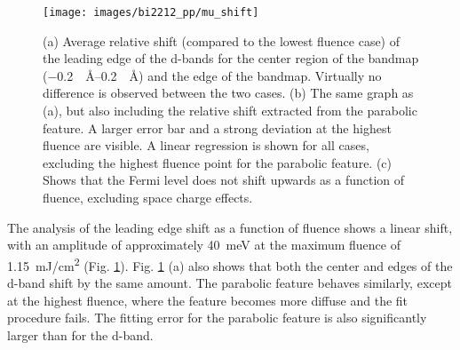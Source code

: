\begin{figure}[b!]
	\centering
	\texttt{[image: images/bi2212\_pp/mu\_shift]}
	\caption{(a) Average relative shift (compared to the lowest fluence case) of the leading edge of the  d-bands for the center region of the bandmap (\qtyrange{-0.2}{0.2}{\per\angstrom}) and the edge of the bandmap. Virtually no difference is observed between the two cases. (b) The same graph as (a), but also including the relative shift extracted from the parabolic feature. A larger error bar and a strong deviation at the highest fluence are visible. A linear regression is shown for all cases, excluding the highest fluence point for the parabolic feature. (c) Shows that the Fermi level does not shift upwards as a function of fluence, excluding space charge effects.}
	\label{fig:mu_shift}
\end{figure}

The analysis of the leading edge shift as a function of fluence shows a linear shift, with an amplitude of approximately \qty{40}{\milli\electronvolt} at the maximum fluence of \qty{1.15}{\milli\joule/\centi\meter\squared} (Fig. \ref{fig:mu_shift}).
Fig. \ref{fig:mu_shift} (a) also shows that both the center and edges of the  d-band shift by the same amount.
The parabolic feature behaves similarly, except at the highest fluence, where the feature becomes more diffuse and the fit procedure fails.
The fitting error for the parabolic feature is also significantly larger than for the  d-band.

